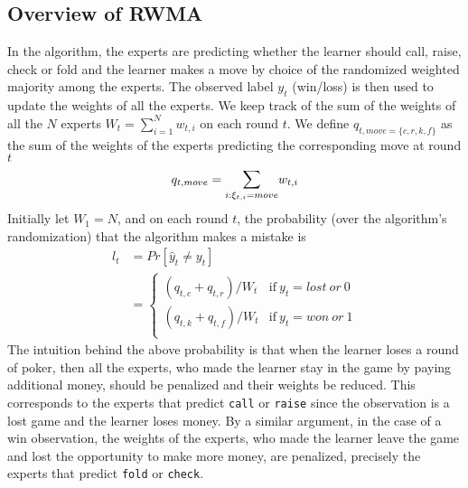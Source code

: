 \documentclass[12pt]{article}
\begin{document}
\subsection{Overview of RWMA}
\label{sec:rwma}
\noindent In the algorithm, the experts are predicting whether the learner should call, raise, check
or fold and the learner makes a move by choice of the randomized weighted majority
among the experts. The observed label $y_t$ (win/loss) is then used to update
the weights of all the experts. We keep track of the sum of the weights of all the $N$ experts $W_t =
\sum_{i=1}^Nw_{t,i}$ on each round $t$. We define $q_{t,move=\{c,r,k,f\}}$ as the sum of the weights
of the experts predicting the corresponding move at round $t$ \ie \[q_{t,move}=\Sum_{i:\xi_{t,i}=move}w_{t,i}\]
Initially let $W_1 = N$,
and on each round $t$, the probability (over the algorithm's randomization) that the algorithm makes a mistake is
\begin{align}
l_t &= Pr[\hat{y}_t\neq y_t]\tag*{}\\
&=\begin{cases}
  	(q_{t,c} + q_{t, r})/W_t & \text{if}~y_{t}=lost~or~0\\
  	(q_{t,k} + q_{t, f})/W_t & \text{if}~y_{t}=won~or~1\\
	\end{cases}
\label{eq:prob-mistake}
\end{align}
\noindent The intuition behind the above probability is that when the learner loses
a round of poker, then all the experts, who made the learner stay in the game by paying
additional money, should be penalized and their weights be reduced. This corresponds to
the experts that predict \texttt{call} or \texttt{raise} since the observation is a lost
game and the learner loses money. By a similar argument, in the case of a win observation,
the weights of the experts, who made the learner leave the game and lost the opportunity
to make more money, are penalized, precisely the experts that predict \texttt{fold} or
\texttt{check}.\\
\end{document}
